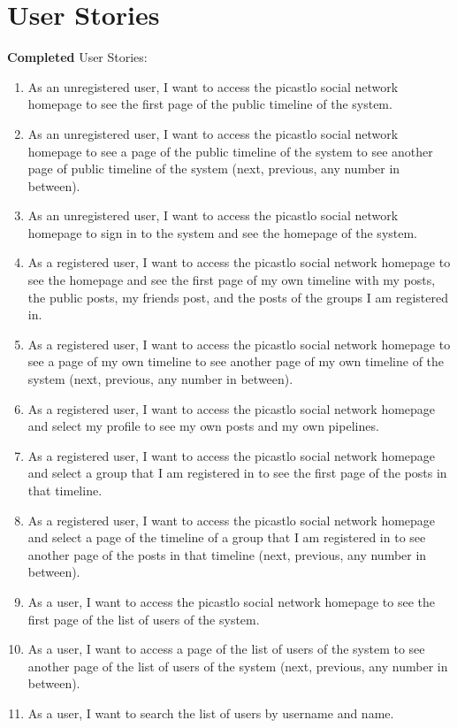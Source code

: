 \documentclass[acmart, nonacm]{acmart}
\begin{document}
\section{User Stories}
\textbf{Completed} User Stories:
\begin{enumerate}
    \item As an unregistered user, I want to access the picastlo social network homepage to see the first page of the public timeline of the system.
    \item As an unregistered user, I want to access the picastlo social network homepage to see a page of the public timeline of the system to see another page of public timeline of 
    the system (next, previous, any number in between).
    \item As an unregistered user, I want to access the picastlo social network homepage to sign in to the system and see the homepage of the system.
    \item As a registered user, I want to access the picastlo social network homepage to see the homepage and see the first page of my own timeline with my posts, the public posts, my friends 
    post, and the posts of the groups I am registered in.
    \item As a registered user, I want to access the picastlo social network homepage to see a page of my own timeline to see another page of my own timeline of the system 
    (next, previous, any number in between).
    \item As a registered user, I want to access the picastlo social network homepage and select my profile to see my own posts and my own pipelines.
    \item As a registered user, I want to access the picastlo social network homepage and select a group that I am registered in to see the first page of the posts in that timeline.
    \item As a registered user, I want to access the picastlo social network homepage and select a page of the timeline of a group that I am registered in to see another page of the posts in that timeline
    (next, previous, any number in between).
    \item As a user, I want to access the picastlo social network homepage to see the first page of the list of users of the system.
    \item As a user, I want to access a page of the list of users of the system to see another page of the list of users of the system (next, previous, any number in between).
    \item As a user, I want to search the list of users by username and name.

\end{enumerate}
\end{document}

